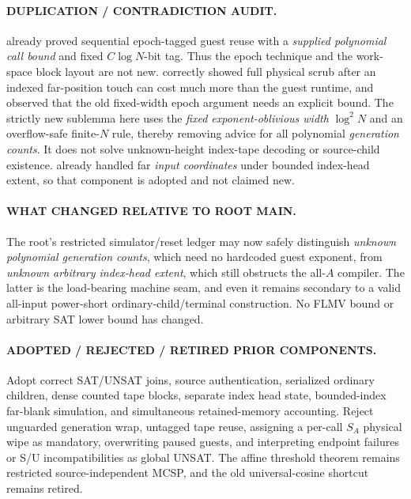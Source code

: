 \documentclass[11pt]{article}
\begin{document}
\paragraph{DUPLICATION / CONTRADICTION AUDIT.}
 already proved sequential epoch-tagged guest reuse with a \emph{supplied polynomial call bound} and fixed $C\log N$-bit tag. Thus the epoch technique and the work-space block layout are not new.  correctly showed full physical scrub after an indexed far-position touch can cost much more than the guest runtime, and observed that the old fixed-width epoch argument needs an explicit bound. The strictly new sublemma here uses the \emph{fixed exponent-oblivious width} $\log^2 N$ and an overflow-safe finite-$N$ rule, thereby removing advice for all polynomial \emph{generation counts}. It does not solve unknown-height index-tape decoding or source-child existence.  already handled far \emph{input coordinates} under bounded index-head extent, so that component is adopted and not claimed new.

\paragraph{WHAT CHANGED RELATIVE TO ROOT MAIN.}
The root's restricted simulator/reset ledger may now safely distinguish \emph{unknown polynomial generation counts}, which need no hardcoded guest exponent, from \emph{unknown arbitrary index-head extent}, which still obstructs the all-$A$ compiler. The latter is the load-bearing machine seam, and even it remains secondary to a valid all-input power-short ordinary-child/terminal construction. No FLMV bound or arbitrary SAT lower bound has changed.

\paragraph{ADOPTED / REJECTED / RETIRED PRIOR COMPONENTS.}
Adopt correct SAT/UNSAT joins, source authentication, serialized ordinary children, dense counted tape blocks, separate index head state, bounded-index far-blank simulation, and simultaneous retained-memory accounting. Reject unguarded generation wrap, untagged tape reuse, assigning a per-call $S_A$ physical wipe as mandatory, overwriting paused guests, and interpreting endpoint failures or S/U incompatibilities as global UNSAT. The affine threshold theorem remains restricted source-independent MCSP, and the old universal-cosine shortcut remains retired.
\end{document}
